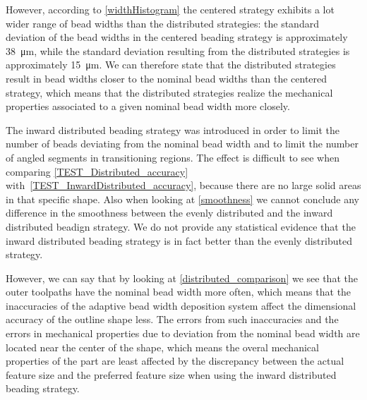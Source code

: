 However, according to \cref{widthHistogram} the centered strategy exhibits a lot wider range of bead widths than the distributed strategies:
the standard deviation of the bead widths in the centered beading strategy is approximately \SI{38}{\micro\meter}, while the standard deviation resulting from the distributed strategies is approximately \SI{15}{\micro\meter}.
We can therefore state that the distributed strategies result in bead widths closer to the nominal bead widths than the centered strategy, which means that the distributed strategies realize the mechanical properties associated to a given nominal bead width more closely.

The inward distributed beading strategy was introduced in order to limit the number of beads deviating from the nominal bead width and to limit the number of angled segments in transitioning regions.
The effect is difficult to see when comparing \cref{TEST_Distributed_accuracy} with~\ref{TEST_InwardDistributed_accuracy}, because there are no large solid areas in that specific shape.
Also when looking at \cref{smoothness} we cannot conclude any difference in the smoothness between the evenly distributed and the inward distributed beadign strategy.
We do not provide any statistical evidence that the inward distributed beading strategy is in fact better than the evenly distributed strategy.

However, we can say that by looking at \cref{distributed_comparison} we see that the outer toolpaths have the nominal bead width more often, which means that the inaccuracies of the adaptive bead width deposition system affect the dimensional accuracy of the outline shape less.
The errors from such inaccuracies and the errors in mechanical properties due to deviation from the nominal bead width are located near the center of the shape, which means the overal mechanical properties of the part are least affected by the discrepancy between the actual feature size and the preferred feature size when using the inward distributed beading strategy.







